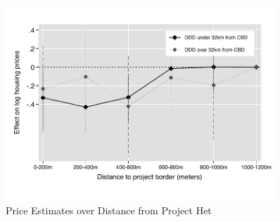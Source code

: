 \documentclass[12pt]{article}
\begin{document}
\begin{figure}
\caption{Price Estimates over Distance from Project Het}\label{figure:distplot_het}
\centering
\includegraphics[width=0.9\textwidth,trim={0cm .7cm 0cm 0.7cm},clip=true]{figures/price_regs_DDDplot_het_4.pdf}
\vspace{-2mm}
\end{figure}



\end{document}
